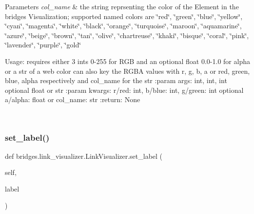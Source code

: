 \begin{DoxyParams}{Parameters}
{\em col\+\_\+name} & the string reprsenting the color of the Element in the bridges Visualization; supported named colors are \char`\"{}red\char`\"{}, \char`\"{}green\char`\"{}, \char`\"{}blue\char`\"{}, \char`\"{}yellow\char`\"{}, \char`\"{}cyan\char`\"{}, \char`\"{}magenta\char`\"{}, \char`\"{}white\char`\"{}, \char`\"{}black\char`\"{}, \char`\"{}orange\char`\"{}, \char`\"{}turquoise\char`\"{}, \char`\"{}maroon\char`\"{}, \char`\"{}aquamarine\char`\"{}, \char`\"{}azure\char`\"{}, \char`\"{}beige\char`\"{}, \char`\"{}brown\char`\"{}, \char`\"{}tan\char`\"{}, \char`\"{}olive\char`\"{}, \char`\"{}chartreuse\char`\"{}, \char`\"{}khaki\char`\"{}, \char`\"{}bisque\char`\"{}, \char`\"{}coral\char`\"{}, \char`\"{}pink\char`\"{}, \char`\"{}lavender\char`\"{}, \char`\"{}purple\char`\"{}, \char`\"{}gold\char`\"{}\begin{DoxyVerb}Usage: requires either 3 ints 0-255 for RGB and an optional float 0.0-1.0 for alpha or a str of a web color
can also key the RGBA values with r, g, b, a or red, green, blue, alpha respectively and col_name for the str
:param args: int, int, int optional float or str
:param kwargs: r/red: int, b/blue: int, g/green: int optional a/alpha: float or col_name: str
:return: None
\end{DoxyVerb}
 \\
\hline
\end{DoxyParams}
\mbox{\label{classbridges_1_1link__visualizer_1_1_link_visualizer_a51cb90a9162271fa083616321ae5faee}} 
\subsubsection{\texorpdfstring{set\+\_\+label()}{set\_label()}}
{\footnotesize\ttfamily def bridges.\+link\+\_\+visualizer.\+Link\+Visualizer.\+set\+\_\+label (\begin{DoxyParamCaption}\item[{}]{self,  }\item[{}]{label }\end{DoxyParamCaption})}

\mbox{\label{classbridges_1_1link__visualizer_1_1_link_visualizer_ae9c3b5a249a4d71d97d8bb3186a17e63}} 
